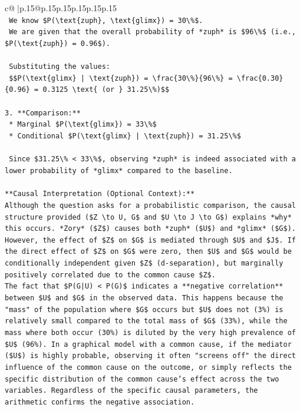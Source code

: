 \documentclass{article}
\begin{document}
{\begin{supertabular}{c@{$\;$}|p{.15\linewidth}@{}p{.15\linewidth}p{.15\linewidth}p{.15\linewidth}p{.15\linewidth}p{.15\linewidth}}
{{{\\ 
\texttt{    We know \$P(\textbackslash{}text\{zuph\}, \textbackslash{}text\{glimx\}) = 30\textbackslash{}\%\$.} \\
\texttt{    We are given that the overall probability of *zuph* is \$96\textbackslash{}\%\$ (i.e., \$P(\textbackslash{}text\{zuph\}) = 0.96\$).} \\
\\ 
\texttt{    Substituting the values:} \\
\texttt{    \$\$P(\textbackslash{}text\{glimx\} | \textbackslash{}text\{zuph\}) = \textbackslash{}frac\{30\textbackslash{}\%\}\{96\textbackslash{}\%\} = \textbackslash{}frac\{0.30\}\{0.96\} = 0.3125 \textbackslash{}text\{ (or \} 31.25\textbackslash{}\%)\$\$} \\
\\ 
\texttt{3.  **Comparison:**} \\
\texttt{    *   Marginal \$P(\textbackslash{}text\{glimx\}) = 33\textbackslash{}\%\$} \\
\texttt{    *   Conditional \$P(\textbackslash{}text\{glimx\} | \textbackslash{}text\{zuph\}) = 31.25\textbackslash{}\%\$} \\
\\ 
\texttt{    Since \$31.25\textbackslash{}\% < 33\textbackslash{}\%\$, observing *zuph* is indeed associated with a lower probability of *glimx* compared to the baseline.} \\
\\ 
\texttt{**Causal Interpretation (Optional Context):**} \\
\texttt{Although the question asks for a probabilistic comparison, the causal structure provided (\$Z \textbackslash{}to U, G\$ and \$U \textbackslash{}to J \textbackslash{}to G\$) explains *why* this occurs. *Zory* (\$Z\$) causes both *zuph* (\$U\$) and *glimx* (\$G\$). However, the effect of \$Z\$ on \$G\$ is mediated through \$U\$ and \$J\$. If the direct effect of \$Z\$ on \$G\$ were zero, then \$U\$ and \$G\$ would be conditionally independent given \$Z\$ (d{-}separation), but marginally positively correlated due to the common cause \$Z\$.} \\
\texttt{The fact that \$P(G|U) < P(G)\$ indicates a **negative correlation** between \$U\$ and \$G\$ in the observed data. This happens because the "mass" of the population where \$G\$ occurs but \$U\$ does not (3\%) is relatively small compared to the total mass of \$G\$ (33\%), while the mass where both occur (30\%) is diluted by the very high prevalence of \$U\$ (96\%). In a graphical model with a common cause, if the mediator (\$U\$) is highly probable, observing it often "screens off" the direct influence of the common cause on the outcome, or simply reflects the specific distribution of the common cause's effect across the two variables. Regardless of the specific causal parameters, the arithmetic confirms the negative association.} \\
}}}
\end{supertabular}}
\end{document}
